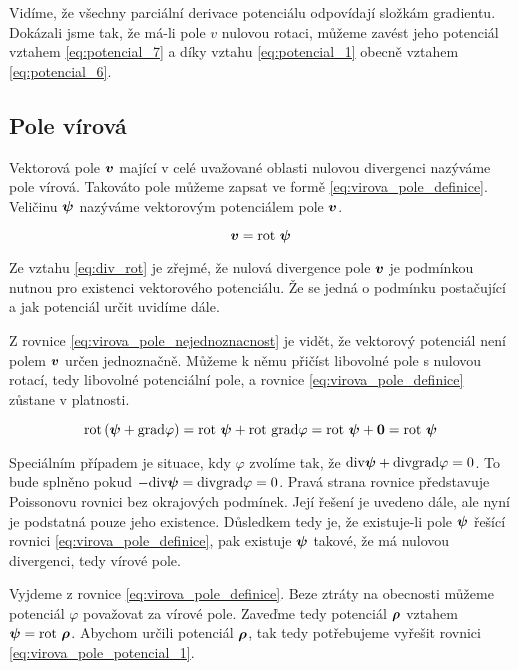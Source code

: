 Vidíme, že všechny parciální derivace potenciálu odpovídají složkám gradientu. Dokázali jsme tak, že má-li pole \(v\) nulovou rotaci, můžeme zavést jeho
potenciál vztahem \eqref{eq:potencial_7} a díky vztahu \eqref{eq:potencial_1} obecně vztahem \eqref{eq:potencial_6}.

\subsection{Pole vírová}
\label{sec:pole_virova}

Vektorová pole \(\boldsymbol{v}\) mající v celé uvažované oblasti nulovou divergenci nazýváme pole vírová. Takováto pole můžeme zapsat ve formě 
\eqref{eq:virova_pole_definice}. Veličinu \(\boldsymbol{\psi}\) nazýváme vektorovým potenciálem pole \(\boldsymbol{v}\).

\begin{equation}
\label{eq:virova_pole_definice}
\boldsymbol{v} = \mathrm{rot} \ \boldsymbol{\psi}
\end{equation}

Ze vztahu \eqref{eq:div_rot} je zřejmé, že nulová divergence pole \(\boldsymbol{v}\) je podmínkou nutnou pro existenci vektorového potenciálu. Že se jedná o podmínku postačující a jak potenciál určit uvidíme dále.

Z rovnice \eqref{eq:virova_pole_nejednoznacnost} je vidět, že vektorový potenciál není polem \(\boldsymbol{v}\) určen jednoznačně.
Můžeme k němu přičíst libovolné pole s nulovou rotací, tedy libovolné potenciální pole, a rovnice \eqref{eq:virova_pole_definice}
zůstane v platnosti.

\begin{equation}
\label{eq:virova_pole_nejednoznacnost}
\mathrm{rot} \left(\boldsymbol{\psi} + \mathrm{grad} \varphi \right) = \mathrm{rot} \ \boldsymbol{\psi} + \mathrm{rot} \ \mathrm{grad} \varphi =
\mathrm{rot} \ \boldsymbol{\psi} + \boldsymbol{0} = \mathrm{rot} \ \boldsymbol{\psi}
\end{equation}

Speciálním případem je situace, kdy \(\varphi\) zvolíme tak, že \(\mathrm{div} \boldsymbol{\psi} + \mathrm{div} \mathrm{grad} \varphi = 0\). To bude splněno pokud
\(-\mathrm{div} \boldsymbol{\psi} = \mathrm{div} \mathrm{grad} \varphi = 0\). Pravá strana rovnice představuje Poissonovu rovnici bez okrajových podmínek.
Její řešení je uvedeno dále, ale nyní je podstatná pouze jeho existence. Důsledkem tedy je, že existuje-li pole \(\boldsymbol{\psi}\) řešící
rovnici \eqref{eq:virova_pole_definice}, pak existuje \(\boldsymbol{\psi}\) takové, že má nulovou divergenci, tedy vírové pole.

Vyjdeme z rovnice \eqref{eq:virova_pole_definice}. Beze ztráty na obecnosti můžeme potenciál \(\varphi\) považovat za vírové pole.
Zaveďme tedy potenciál \(\boldsymbol{\rho}\) vztahem \(\boldsymbol{\psi} = \mathrm{rot} \ \boldsymbol{\rho}\). Abychom určili potenciál \(\boldsymbol{\rho}\), tak tedy
potřebujeme vyřešit rovnici \eqref{eq:virova_pole_potencial_1}.

